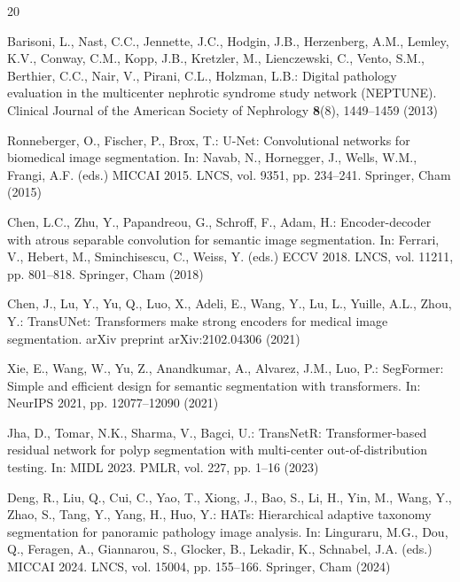 \documentclass[runningheads]{llncs}
\begin{document}
\begin{thebibliography}{20}

Barisoni, L., Nast, C.C., Jennette, J.C., Hodgin, J.B., Herzenberg, A.M., Lemley, K.V., Conway, C.M., Kopp, J.B., Kretzler, M., Lienczewski, C., Vento, S.M., Berthier, C.C., Nair, V., Pirani, C.L., Holzman, L.B.: Digital pathology evaluation in the multicenter nephrotic syndrome study network (NEPTUNE). Clinical Journal of the American Society of Nephrology \textbf{8}(8), 1449--1459 (2013)

Ronneberger, O., Fischer, P., Brox, T.: U-Net: Convolutional networks for biomedical image segmentation. In: Navab, N., Hornegger, J., Wells, W.M., Frangi, A.F. (eds.) MICCAI 2015. LNCS, vol. 9351, pp. 234--241. Springer, Cham (2015)

Chen, L.C., Zhu, Y., Papandreou, G., Schroff, F., Adam, H.: Encoder-decoder with atrous separable convolution for semantic image segmentation. In: Ferrari, V., Hebert, M., Sminchisescu, C., Weiss, Y. (eds.) ECCV 2018. LNCS, vol. 11211, pp. 801--818. Springer, Cham (2018)

Chen, J., Lu, Y., Yu, Q., Luo, X., Adeli, E., Wang, Y., Lu, L., Yuille, A.L., Zhou, Y.: TransUNet: Transformers make strong encoders for medical image segmentation. arXiv preprint arXiv:2102.04306 (2021)

Xie, E., Wang, W., Yu, Z., Anandkumar, A., Alvarez, J.M., Luo, P.: SegFormer: Simple and efficient design for semantic segmentation with transformers. In: NeurIPS 2021, pp. 12077--12090 (2021)

Jha, D., Tomar, N.K., Sharma, V., Bagci, U.: TransNetR: Transformer-based residual network for polyp segmentation with multi-center out-of-distribution testing. In: MIDL 2023. PMLR, vol. 227, pp. 1--16 (2023)

Deng, R., Liu, Q., Cui, C., Yao, T., Xiong, J., Bao, S., Li, H., Yin, M., Wang, Y., Zhao, S., Tang, Y., Yang, H., Huo, Y.: HATs: Hierarchical adaptive taxonomy segmentation for panoramic pathology image analysis. In: Linguraru, M.G., Dou, Q., Feragen, A., Giannarou, S., Glocker, B., Lekadir, K., Schnabel, J.A. (eds.) MICCAI 2024. LNCS, vol. 15004, pp. 155--166. Springer, Cham (2024)


\end{thebibliography}
\end{document}
